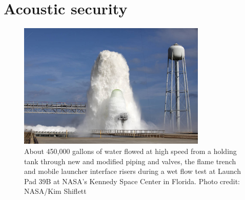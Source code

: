 \section{Acoustic security}


\begin{figure}[h]
	\centering
	\includegraphics[width=0.8\textwidth]{img/launch_pad_39b_water_deluge_test.jpg}
	\caption[Water deluge system test at Kennedy Space Center]
	{About 450,000 gallons of water flowed at high speed from a holding
	tank through new and modified piping and valves, the flame trench and
	mobile launcher interface risers during a wet flow test at Launch Pad
	39B at NASA's Kennedy Space Center in Florida. Photo credit: NASA/Kim Shiflett}
	\label{fig:deluge_39b_kennedy}
\end{figure}
